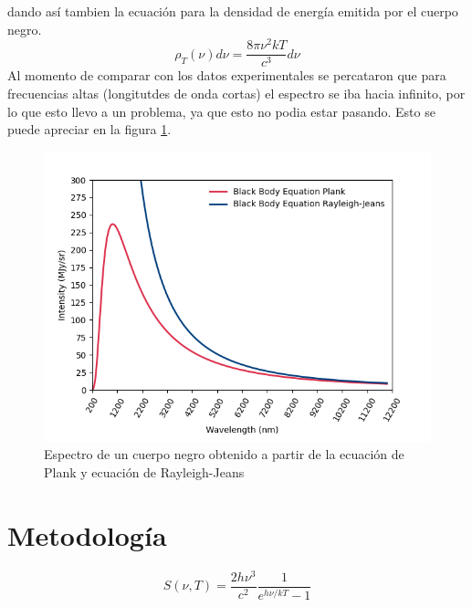 \documentclass[12pt,letterpaper]{article}
\begin{document}
\begin{multicols}{2}
\begin{equation}
\end{equation}
dando así tambien la ecuación para la densidad de energía emitida por el cuerpo negro. 
\begin{equation}
    \rho_T(\nu) d\nu = \frac{8\pi \nu^2 k T}{c^3} d\nu 
\end{equation}
Al momento de comparar con los datos experimentales se percataron que para frecuencias altas (longitutdes de onda cortas) el espectro se iba hacia infinito, por lo que esto llevo a un problema, ya que esto no podia estar pasando. Esto se puede apreciar en la figura \ref{teovsexp}.
\begin{figure}[H]
\includegraphics[scale=0.5]{../Graphics/exp_vs_teo.png}
\caption{Espectro de un cuerpo negro obtenido a partir de la ecuación de Plank y ecuación de Rayleigh-Jeans}
\label{teovsexp}
\end{figure}
\section*{Metodología}
\begin{equation}
S(\nu,T)= \frac{2h\nu^3}{c^2} \frac{1}{e^{h\nu/kT}-1}
\label{body equation}
\end{equation}

\end{multicols}
\end{document}
